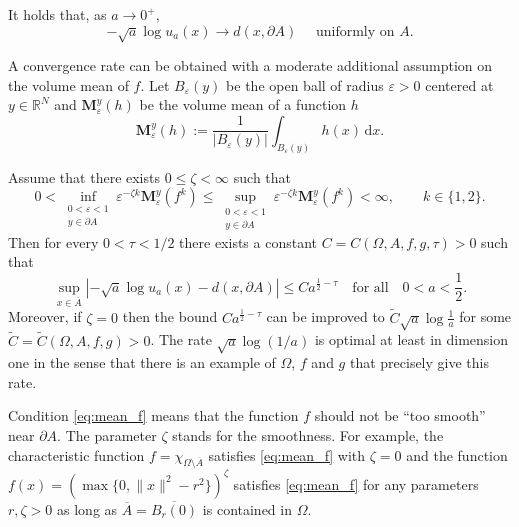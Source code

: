 \documentclass[graybox]{svmult}
\newcommand{\ep}{\varepsilon}
\renewcommand{\d}{\mathrm{d}}  %
\newcommand{\R}{\mathbb{R}}  %
\renewcommand{\AA}{A}  %
\newcommand{\vmean}{\mathbf{M}}  %
\begin{document}
\begin{theorem}[\cite{M}]\label{T:main}
It holds that, as $a\to0^+$, 
$$
-\sqrt{a}\log u_a(x) \to d (x, \partial \AA)
\quad \text{ uniformly on } \AA.   
$$   
\end{theorem}

A convergence rate can be obtained with a moderate additional assumption on the volume mean of $f$. Let $B_\ep(y)$ be the open ball of radius $\ep>0$ centered at $y \in \R^N$ and $\vmean_\ep^y(h)$ be the volume mean of a function $h$
$$
\vmean_\ep^y(h)
:=
\frac{1}{| B_\ep(y)|}
\int_{B_\ep(y)} h(x)\, \d x.
$$



\begin{theorem}\label{T:rate}
Assume that there exists $0\le \zeta<\infty$ such that
\begin{equation} \label{eq:mean_f}
0<  \inf_{\substack{0< \ep <1\\ y \in \partial \AA}}\ep^{-\zeta k} \vmean_\ep^y(f^k) \le  \sup_{\substack{0< \ep <1\\ y \in \partial \AA}}\ep^{-\zeta k} \vmean_\ep^y(f^k) <\infty, \qquad  k\in\{1,2\}. 
\end{equation}
 Then for every $0<\tau <1/2$ there exists a constant $C= C(\Omega,\AA,f,g,\tau)>0$ such that
\begin{equation*}%
\sup_{x\in \overline{\AA}} \left| -\sqrt{a} \log u_a(x) - d(x, \partial \AA)\right| \le Ca^{\frac1{2}-\tau} \quad \text{for all} \quad 0<a<\frac1{2}.  
\end{equation*}
Moreover, if $\zeta=0$ then the bound $C a^{\frac1{2}-\tau}$ can be improved to $\tilde C \sqrt{a} \log \frac{1}{a}$ for some $\tilde C=\tilde C(\Omega, \AA, f,g)>0$. The rate $\sqrt{a}\log(1/a)$ is optimal  at least in dimension one in the sense that there is an example of $\Omega$, $f$ and $g$ that precisely give this rate. 
\end{theorem}


Condition \eqref{eq:mean_f} means that the function $f$ should not be ``too smooth'' near $\partial \AA$. The parameter $\zeta$ stands for the smoothness.  For example, the characteristic function $f=\chi_{\Omega \setminus \overline{\AA}}$ satisfies \eqref{eq:mean_f} with $\zeta=0$ and the function $f(x)=(\max\{0, \|x\|^2-r^2 \})^\zeta$ satisfies \eqref{eq:mean_f} for any parameters $r,\zeta>0$ as long as $\overline{\AA} = \overline{B_r(0)}$ is contained in $\Omega$.  
\end{document}
